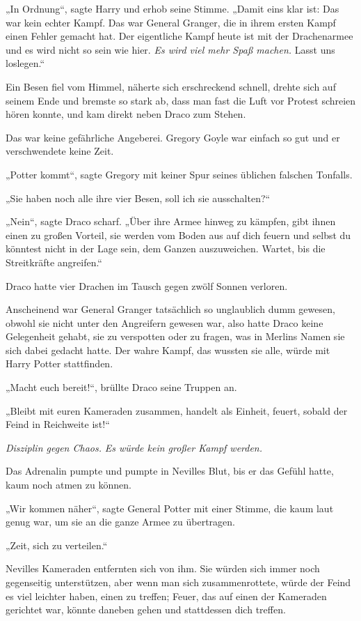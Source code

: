 {„In Ordnung“, sagte Harry und erhob seine Stimme. „Damit eins klar ist: Das war kein echter Kampf. Das war General Granger, die in ihrem ersten Kampf einen Fehler gemacht hat. Der eigentliche Kampf heute ist mit der Drachenarmee und es wird nicht so sein wie hier. \emph{Es wird viel mehr Spaß machen.} Lasst uns loslegen.“

Ein Besen fiel vom Himmel, näherte sich erschreckend schnell, drehte sich auf seinem Ende und bremste so stark ab, dass man fast die Luft vor Protest schreien hören konnte, und kam direkt neben Draco zum Stehen.

Das war keine gefährliche Angeberei. Gregory Goyle war einfach so gut und er verschwendete keine Zeit.

„Potter kommt“, sagte Gregory mit keiner Spur seines üblichen falschen Tonfalls.

„Sie haben noch alle ihre vier Besen, soll ich sie ausschalten?“

„Nein“, sagte Draco scharf. „Über ihre Armee hinweg zu kämpfen, gibt ihnen einen zu großen Vorteil, sie werden vom Boden aus auf dich feuern und selbst du könntest nicht in der Lage sein, dem Ganzen auszuweichen. Wartet, bis die Streitkräfte angreifen.“

Draco hatte vier Drachen im Tausch gegen zwölf Sonnen verloren.

Anscheinend war General Granger tatsächlich so unglaublich dumm gewesen, obwohl sie nicht unter den Angreifern gewesen war, also hatte Draco keine Gelegenheit gehabt, sie zu verspotten oder zu fragen, was in Merlins Namen sie sich dabei gedacht hatte. Der wahre Kampf, das wussten sie alle, würde mit Harry Potter stattfinden.

„Macht euch bereit!“, brüllte Draco seine Truppen an.

„Bleibt mit euren Kameraden zusammen, handelt als Einheit, feuert, sobald der Feind in Reichweite ist!“

\emph{Disziplin gegen Chaos.} \emph{Es würde kein großer Kampf werden.}

Das Adrenalin pumpte und pumpte in Nevilles Blut, bis er das Gefühl hatte, kaum noch atmen zu können.

„Wir kommen näher“, sagte General Potter mit einer Stimme, die kaum laut genug war, um sie an die ganze Armee zu übertragen.

„Zeit, sich zu verteilen.“

Nevilles Kameraden entfernten sich von ihm. Sie würden sich immer noch gegenseitig unterstützen, aber wenn man sich zusammenrottete, würde der Feind es viel leichter haben, einen zu treffen; Feuer, das auf einen der Kameraden gerichtet war, könnte daneben gehen und stattdessen dich treffen.

}

